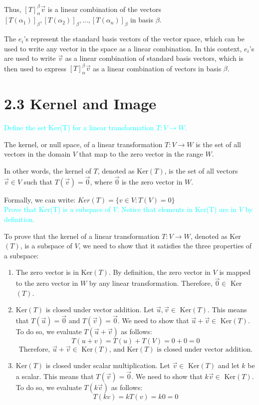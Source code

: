 \documentclass[fontsize=12pt]{scrartcl}
\begin{document}
\noindent
Thus, $[T]_{\alpha}^{\beta}\vec{v}$ is a linear combination of the vectors $[T(\alpha_1)]_{\beta}, [T(\alpha_2)]_{\beta}, \ldots, [T(\alpha_n)]_{\beta}$ in basis $\beta$.

\noindent
The $e_i$'s represent the standard basis vectors of the vector space, which can be used to write any vector in the space as a linear combination. In this context, $e_i$'s are used to write $\vec{v}$ as a linear combination of standard basis vectors, which is then used to express $[T]_{\alpha}^{\beta}\vec{v}$ as a linear combination of vectors in basis $\beta$.

\newpage

\section{2.3 Kernel and Image}

\noindent
\textcolor{cyan}{Define the set Ker(T) for a linear transformation $T: V \to W$.}

\noindent
The kernel, or null space, of a linear transformation $T: V \rightarrow W$ is the set of all vectors in the domain $V$ that map to the zero vector in the range $W$.

\noindent
In other words, the kernel of $T$, denoted as Ker$(T)$, is the set of all vectors $\vec{v} \in V$ such that $T(\vec{v}) = \vec{0}$, where $\vec{0}$ is the zero vector in $W$.

\noindent
Formally, we can write: $Ker(T) = \{v \in V: T(V)=0 \}$
\\

\noindent
\textcolor{cyan}{Prove that Ker(T) is a subspace of $V$. Notice that elements in Ker(T) are in $V$ by definition.}

\noindent
To prove that the kernel of a linear transformation $T: V \rightarrow W$, denoted as Ker$(T)$, is a subspace of $V$, we need to show that it satisfies the three properties of a subspace:

\begin{enumerate}
	\item The zero vector is in Ker$(T)$. By definition, the zero vector in $V$ is mapped to the zero vector in $W$ by any linear transformation. Therefore, $\vec{0} \in$ Ker$(T)$. 
	\item Ker$(T)$ is closed under vector addition. Let $\vec{u}, \vec{v} \in$ Ker$(T)$. This means that $T(\vec{u}) = \vec{0}$ and $T(\vec{v}) = \vec{0}$. We need to show that $\vec{u}+\vec{v} \in$ Ker$(T)$. To do so, we evaluate $T(\vec{u}+\vec{v})$ as follows:
$$T(u + v) = T(u) + T(V) = 0 + 0 = 0 $$
$$\text{Therefore, $\vec{u}+\vec{v} \in$ Ker$(T)$, and Ker$(T)$ is closed under vector addition.} $$
	\item Ker$(T)$ is closed under scalar multiplication. Let $\vec{v} \in$ Ker$(T)$ and let $k$ be a scalar. This means that $T(\vec{v}) = \vec{0}$. We need to show that $k\vec{v} \in$ Ker$(T)$. To do so, we evaluate $T(k\vec{v})$ as follows:
$$T(kv) = kT(v) = k0 = 0 $$
\end{enumerate}
\end{document}
